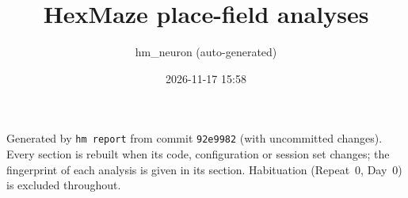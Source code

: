 \documentclass[11pt,a4paper]{article}
\title{HexMaze place-field analyses}
\author{hm\_neuron (auto-generated)}
\date{2026-11-17 15:58}
\begin{document}
\maketitle
\noindent Generated by \texttt{hm report} from commit \texttt{92e9982} (with uncommitted changes).
Every section is rebuilt when its code, configuration or session set changes;
the fingerprint of each analysis is given in its section. Habituation
(Repeat~0, Day~0) is excluded throughout.





\end{document}

